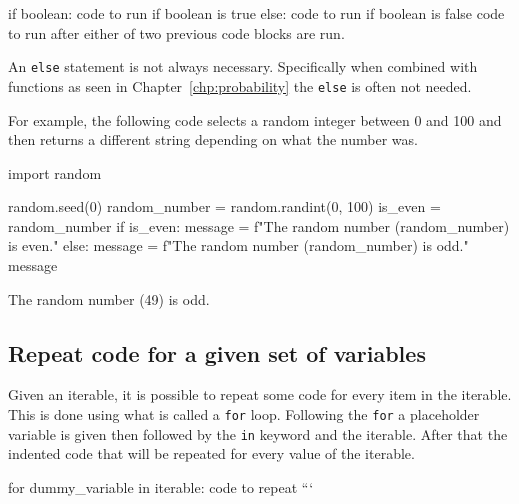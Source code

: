 \begin{pyin}
if boolean:
    code to run if boolean is true
else:
    code to run if boolean is false
code to run after either of two previous code blocks are run.
\end{pyin}



\begin{note}
An \texttt{else} statement is not always necessary. Specifically when combined with
functions as seen in Chapter~\ref{chp:probability}
the \texttt{else} is often not needed.
\end{note}


For example, the following code selects a random integer between 0 and 100 and
then returns a different string depending on what the number was.




\begin{pyin}
import random

random.seed(0)
random_number = random.randint(0, 100)
is_even = random_number %
if is_even:
    message = f"The random number ({random_number}) is even."
else:
    message = f"The random number ({random_number}) is odd."
message
\end{pyin}





\begin{pyin}
\PYGZsq{}The random number (49) is odd.\PYGZsq{}
\end{pyin}





\subsection{Repeat code \textbf{for} a given set of variables}
\label{\detokenize{building-tools/01-variables-conditionals-loops/how/main:repeat-code-for-a-given-set-of-variables}}

Given an iterable, it is possible to repeat some code for every item in the
iterable. This is done using what is called a \texttt{for} loop. Following the
\texttt{for} a
placeholder variable is given then followed by the \texttt{in} keyword and the iterable.
After that the indented code that will be repeated for every value of the
iterable.


\begin{pyin}
for dummy_variable in iterable:
    code to repeat
    ```
\end{pyin}



